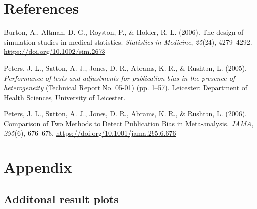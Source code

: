\documentclass[
  english,
  doc,floatsintext,draftall]{apa6}
\begin{document}
\newpage

\newpage

\hypertarget{references}{%
\section{References}\label{references}}

\begingroup
\setlength{\parindent}{-0.5in}
\setlength{\leftskip}{0.5in}

\hypertarget{refs}{}
\leavevmode\hypertarget{ref-burton_design_2006}{}%
Burton, A., Altman, D. G., Royston, P., \& Holder, R. L. (2006). The design of simulation studies in medical statistics. \emph{Statistics in Medicine}, \emph{25}(24), 4279--4292. \url{https://doi.org/10.1002/sim.2673}

\leavevmode\hypertarget{ref-peters_performance_2005}{}%
Peters, J. L., Sutton, A. J., Jones, D. R., Abrams, K. R., \& Rushton, L. (2005). \emph{Performance of tests and adjustments for publication bias in the presence of heterogeneity} (Technical Report No. 05-01) (pp. 1--57). Leicester: Department of Health Sciences, University of Leicester.

\leavevmode\hypertarget{ref-peters_comparison_2006}{}%
Peters, J. L., Sutton, A. J., Jones, D. R., Abrams, K. R., \& Rushton, L. (2006). Comparison of Two Methods to Detect Publication Bias in Meta-analysis. \emph{JAMA}, \emph{295}(6), 676--678. \url{https://doi.org/10.1001/jama.295.6.676}

\newpage

\hypertarget{appendix}{%
\section{Appendix}\label{appendix}}

\hypertarget{additonal-result-plots}{%
\subsection{Additonal result plots}\label{additonal-result-plots}}
\end{document}
